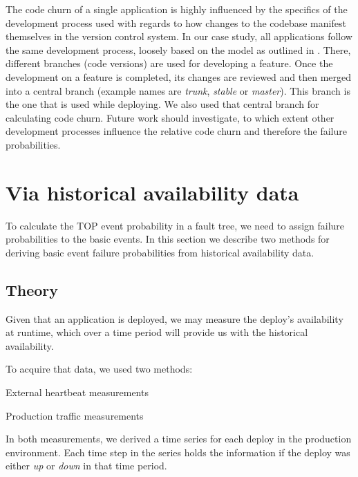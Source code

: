 The code churn of a single application is highly influenced by the specifics of the development process used with regards to how changes to the codebase manifest themselves in the version control system. In our case study, all applications follow the same development process, loosely based on the model as outlined in \cite{GitFlow}. There, different branches (code versions) are used for developing a feature. Once the development on a feature is completed, its changes are reviewed and then merged into a central branch (example names are \emph{trunk}, \emph{stable} or \emph{master}). This branch is the one that is used while deploying. We also used that central branch for calculating code churn. Future work should investigate, to which extent other development processes influence the relative code churn and therefore the failure probabilities.

\section{Via historical availability data}
\label{sec:historical_availability}

To calculate the TOP event probability in a fault tree, we need to assign failure probabilities to the basic events. In this section we describe two methods for deriving basic event failure probabilities from historical availability data.

\subsection{Theory}
\label{subsec:historical_availability_theory}

Given that an application is deployed, we may measure the deploy's availability at runtime, which over a time period will provide us with the historical availability.

To acquire that data, we used two methods:
\begin{tenumerate}
  \item External heartbeat measurements
  \item Production traffic measurements
\end{tenumerate}

In both measurements, we derived a time series for each deploy in the production environment. Each time step in the series holds the information if the deploy was either \emph{up} or \emph{down} in that time period.

